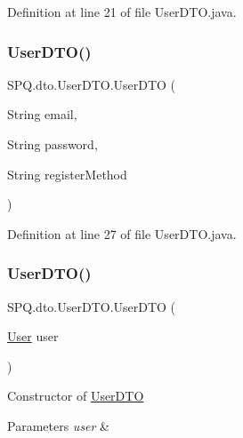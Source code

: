 Definition at line 21 of file User\+D\+T\+O.\+java.

\mbox{\label{class_s_p_q_1_1dto_1_1_user_d_t_o_a97b230ddb1c2eb2cbd7ced33922fb2d2}} 
\subsubsection{\texorpdfstring{User\+D\+T\+O()}{UserDTO()}\hspace{0.1cm}{\footnotesize\ttfamily [6/11]}}
{\footnotesize\ttfamily S\+P\+Q.\+dto.\+User\+D\+T\+O.\+User\+D\+TO (\begin{DoxyParamCaption}\item[{String}]{email,  }\item[{String}]{password,  }\item[{String}]{register\+Method }\end{DoxyParamCaption})}



Definition at line 27 of file User\+D\+T\+O.\+java.

\mbox{\label{class_s_p_q_1_1dto_1_1_user_d_t_o_a40cad7b1dea2117ed4cb0e69fdc6b929}} 
\subsubsection{\texorpdfstring{User\+D\+T\+O()}{UserDTO()}\hspace{0.1cm}{\footnotesize\ttfamily [7/11]}}
{\footnotesize\ttfamily S\+P\+Q.\+dto.\+User\+D\+T\+O.\+User\+D\+TO (\begin{DoxyParamCaption}\item[{\mbox{\hyperlink{class_s_p_q_1_1data_1_1_user}{User}}}]{user }\end{DoxyParamCaption})}

Constructor of \mbox{\hyperlink{class_s_p_q_1_1dto_1_1_user_d_t_o}{User\+D\+TO}} 
\begin{DoxyParams}{Parameters}
{\em user} & \\
\hline
\end{DoxyParams}


